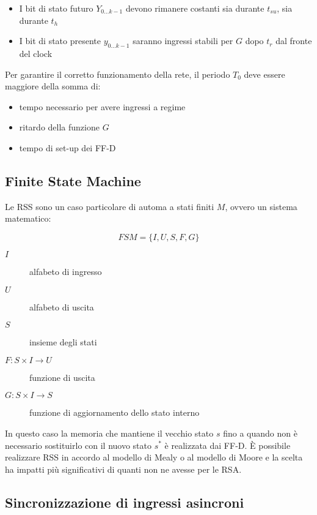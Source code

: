 \documentclass{subfiles}
\begin{document}
\begin{itemize}
    \item I bit di stato futuro $Y_{0 \dots k-1}$ devono rimanere costanti sia durante $t_{su}$, sia durante $t_h$
    \item I bit di stato presente $y_{0 \dots k-1}$ saranno ingressi stabili per $G$ dopo $t_r$ dal fronte del clock
\end{itemize}

\noindent
Per garantire il corretto funzionamento della rete, il periodo $T_0$ deve essere maggiore della somma di:

\begin{itemize}
\item tempo necessario per avere ingressi a regime
\item ritardo della funzione $G$
\item tempo di set-up dei FF-D
\end{itemize}

\subsection{Finite State Machine}

Le RSS sono un caso particolare di automa a stati finiti $M$, ovvero un sistema matematico:

$$
FSM = \{ I,U,S,F,G \}
$$

\begin{description}
    \item[$I$] alfabeto di ingresso
    \item[$U$] alfabeto di uscita
    \item[$S$] insieme degli stati
\end{description}

\begin{description}
    \item[$F: S \times I \to U$] funzione di uscita
    \item[$G: S \times I \to S$] funzione di aggiornamento dello stato interno
\end{description}

\noindent
In questo caso la memoria che mantiene il vecchio stato $s$ fino a quando non è necessario sostituirlo con il nuovo stato $s^*$ è realizzata dai FF-D.
È possibile realizzare RSS in accordo al modello di Mealy o al modello di Moore e la scelta ha impatti più significativi di quanti non ne avesse per le RSA.

\subsection{Sincronizzazione di ingressi asincroni}
\end{document}
